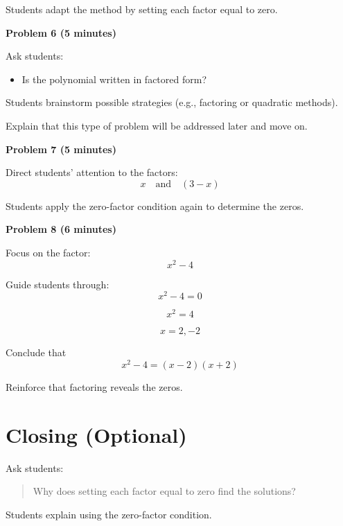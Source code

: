 \documentclass[11pt]{article}
\begin{document}
Students adapt the method by setting each factor equal to zero.

\textbf{Problem 6 (5 minutes)}

Ask students:
\begin{itemize}
\item Is the polynomial written in factored form?
\end{itemize}

Students brainstorm possible strategies (e.g., factoring or quadratic methods).

Explain that this type of problem will be addressed later and move on.

\textbf{Problem 7 (5 minutes)}

Direct students’ attention to the factors:
\[
x \quad \text{and} \quad (3-x)
\]

Students apply the zero-factor condition again to determine the zeros.

\textbf{Problem 8 (6 minutes)}

Focus on the factor:
\[
x^2 - 4
\]

Guide students through:
\[
x^2 - 4 = 0
\]

\[
x^2 = 4
\]

\[
x = 2, -2
\]

Conclude that
\[
x^2 - 4 = (x-2)(x+2)
\]

Reinforce that factoring reveals the zeros.

\section*{Closing (Optional)}

Ask students:

\begin{quote}
Why does setting each factor equal to zero find the solutions?
\end{quote}

Students explain using the zero-factor condition.
\end{document}
